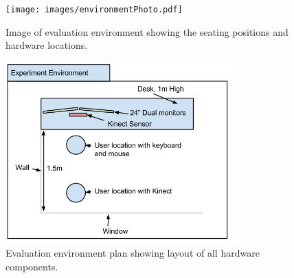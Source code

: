 \begin{figure}[H]
  \centering
      \texttt{[image: images/environmentPhoto.pdf]}
  \caption[Image of evaluation environment]{Image of evaluation environment showing the seating positions and hardware locations.}  
    \label{fig:environment}
\end{figure}


\begin{figure}[H]
  \centering
      \includegraphics[width=0.8\textwidth]{images/environment.png}
  \caption[Evaluation environment plan]{Evaluation environment plan showing layout of all hardware components.}  
    \label{fig:environment}
\end{figure}


